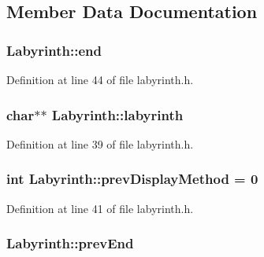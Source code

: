 \subsection{Member Data Documentation}
\hypertarget{class_labyrinth_a5536b8752cb3c2ef273360e14224bc6f}{
\subsubsection[{end}]{ Labyrinth\-::end\hspace{0.3cm}{\ttfamily [private]}}}\label{class_labyrinth_a5536b8752cb3c2ef273360e14224bc6f}


Definition at line 44 of file labyrinth.\-h.

\hypertarget{class_labyrinth_ac95a1b4246b9351e8cea8c1618bcb58d}{
\subsubsection[{labyrinth}]{\setlength{\rightskip}{0pt plus 5cm}char$\ast$$\ast$ Labyrinth\-::labyrinth\hspace{0.3cm}{\ttfamily [private]}}}\label{class_labyrinth_ac95a1b4246b9351e8cea8c1618bcb58d}


Definition at line 39 of file labyrinth.\-h.

\hypertarget{class_labyrinth_a7ddef18e25e03408485e4959bcb5aebc}{
\subsubsection[{prev\-Display\-Method}]{\setlength{\rightskip}{0pt plus 5cm}int Labyrinth\-::prev\-Display\-Method = 0\hspace{0.3cm}{\ttfamily [private]}}}\label{class_labyrinth_a7ddef18e25e03408485e4959bcb5aebc}


Definition at line 41 of file labyrinth.\-h.

\hypertarget{class_labyrinth_a9041d96d4328dea374deb81ff08bd35c}{
\subsubsection[{prev\-End}]{ Labyrinth\-::prev\-End\hspace{0.3cm}{\ttfamily [private]}}}\label{class_labyrinth_a9041d96d4328dea374deb81ff08bd35c}


